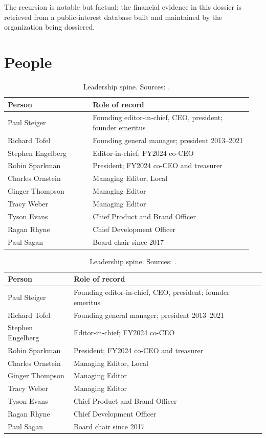 \documentclass[10pt,letterpaper,twocolumn]{article}
\begin{document}
The recursion is notable but factual: the financial evidence in this dossier is retrieved from a public-interest database built and maintained by the organization being dossiered.

\section{People}

\begin{table}[H]
\ifdefined\cardindex
\scriptsize\centering\setlength{\tabcolsep}{2pt}
\begin{tabular}{@{}p{0.33\linewidth}p{0.62\linewidth}@{}}
\toprule
\textbf{Person} & \textbf{Role of record}\\
\midrule
Paul Steiger & Founding editor-in-chief, CEO, president; founder emeritus\\
Richard Tofel & Founding general manager; president 2013--2021\\
Stephen Engelberg & Editor-in-chief; FY2024 co-CEO\\
Robin Sparkman & President; FY2024 co-CEO and treasurer\\
Charles Ornstein & Managing Editor, Local\\
Ginger Thompson & Managing Editor\\
Tracy Weber & Managing Editor\\
Tyson Evans & Chief Product and Brand Officer\\
Ragan Rhyne & Chief Development Officer\\
Paul Sagan & Board chair since 2017\\
\bottomrule
\end{tabular}
\else
\footnotesize\centering\setlength{\tabcolsep}{3pt}
\begin{tabularx}{\columnwidth}{lX}
\toprule
\textbf{Person} & \textbf{Role of record}\\
\midrule
Paul Steiger & Founding editor-in-chief, CEO, president; founder emeritus\\
Richard Tofel & Founding general manager; president 2013--2021\\
Stephen Engelberg & Editor-in-chief; FY2024 co-CEO\\
Robin Sparkman & President; FY2024 co-CEO and treasurer\\
Charles Ornstein & Managing Editor, Local\\
Ginger Thompson & Managing Editor\\
Tracy Weber & Managing Editor\\
Tyson Evans & Chief Product and Brand Officer\\
Ragan Rhyne & Chief Development Officer\\
Paul Sagan & Board chair since 2017\\
\bottomrule
\end{tabularx}
\fi
\caption{Leadership spine. Sources: \citet{pp2025,ppleadership,pp990}.}
\end{table}
\end{document}
